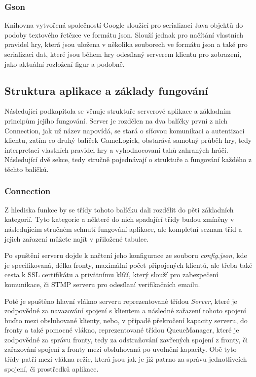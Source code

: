 \documentclass[12pt]{article}
\begin{document}
\subsubsection{Gson}
Knihovna vytvořená společností Google sloužící pro serializaci Java objektů do podoby textového řetězce ve formátu json. Slouží jednak pro načítání vlastních pravidel hry, která jsou uložena v několika souborech ve formátu json a také pro serializaci dat, které jsou během hry odesílaný serverem klientu pro zobrazení, jako aktuální rozložení figur a podobně.
\newpage
\subsection{Struktura aplikace a základy fungování}
Následující podkapitola se věnuje struktuře serverové aplikace a základním principům jejího fungování. Server je rozdělen na dva balíčky první z nich Connection, jak už název napovídá, se stará o síťovou komunikaci a autentizaci klientu, zatím co druhý balíček GameLogick, obstarává samotný průběh hry, tedy interpretaci vlastních pravidel hry a vyhodnocovaní tahů zahraných hráči. Následující dvě sekce, tedy stručně pojednávají o struktuře a fungování každého z těchto balíčků. 
\subsubsection{Connection}
Z hlediska funkce by se třídy tohoto balíčku dali rozdělit do pěti základních kategorií. Tyto kategorie a některé do nich spadající třídy budou zmíněny v následujícím stručném schnutí fungování aplikace, ale kompletní seznam tříd a jejich zařazení můžete najít v přiložené tabulce.

Po spuštění serveru dojde k načtení jeho konfigurace ze souboru \textit{config.json}, kde je specifikovaná, délka fronty, maximální počet připojených klientů, ale třeba také cesta k SSL certifikátu a privátnímu klíčí, který slouží pro zabezpečení komunikace, či STMP serveru pro odesílaní verifikačních emailu.

Poté je spuštěno hlavní vlákno serveru reprezentované třídou \textit{Server}, které je zodpovědné za navazování spojení s klientem a následné zařazení tohoto spojení buďto mezi obsluhované klienty, nebo, v případě překročení kapacity serveru, do fronty a také pomocné vlákno, reprezentované třídou \textit{}{QueueManager}, které je zodpovědné za správu fronty, tedy za odstraňování zavřených spojení z fronty, či zařazování spojení z fronty mezi obsluhovaná po uvolnění kapacity. Obě tyto třídy patří mezi vlákna režie, která jsou jak je již patrno za správu jednotlivcích spojení, či prostředků aplikace.
\end{document}
